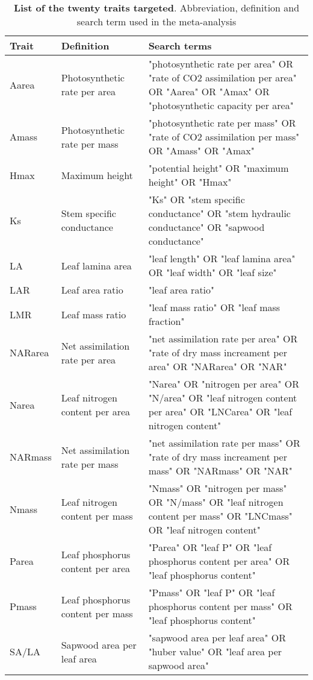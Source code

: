 \documentclass[a4paper]{article}\usepackage[]{graphicx}\usepackage[]{color}
\begin{document}
\begin{appendices}
\begin{table}[ht]
\centering
\caption{\textbf{List of the twenty traits targeted}. Abbreviation,
definition and search term used in the meta-analysis} 
\label{TableA1}
\vspace{0.5cm}
\begin{tabular}{p{3cm}p{3cm}p{8cm}}
  \hline
Trait & Definition & Search terms \\
  \hline
Aarea & Photosynthetic rate per area & "photosynthetic rate per area" OR "rate of CO2 assimilation per area" OR "Aarea" OR "Amax" OR "photosynthetic capacity per area" \\
  Amass & Photosynthetic rate per mass & "photosynthetic rate per mass" OR "rate of CO2 assimilation per mass" OR "Amass" OR "Amax" \\
  Hmax & Maximum height & "potential height" OR "maximum height" OR "Hmax" \\
  Ks & Stem specific conductance & "Ks" OR "stem specific conductance" OR "stem hydraulic conductance" OR "sapwood conductance" \\
  LA & Leaf lamina area & "leaf length" OR "leaf lamina area" OR "leaf width" OR "leaf size" \\
  LAR & Leaf area ratio & "leaf area ratio" \\
  LMR & Leaf mass ratio & "leaf mass ratio" OR "leaf mass fraction" \\
  NARarea & Net assimilation rate per area &  "net assimilation rate per area" OR "rate of dry mass increament per area" OR "NARarea" OR "NAR" \\
  Narea & Leaf nitrogen content per area & "Narea" OR "nitrogen per area" OR "N/area" OR "leaf nitrogen content per area" OR "LNCarea" OR "leaf nitrogen content" \\
  NARmass & Net assimilation rate per mass &  "net assimilation rate per mass" OR "rate of dry mass increament per mass" OR "NARmass" OR "NAR" \\
  Nmass & Leaf nitrogen content per mass & "Nmass" OR "nitrogen per mass" OR "N/mass" OR "leaf nitrogen content per mass" OR "LNCmass" OR "leaf nitrogen content" \\
  Parea & Leaf phosphorus content per area & "Parea" OR "leaf P" OR  "leaf phosphorus content per area"  OR "leaf phosphorus content" \\
  Pmass & Leaf phosphorus content per mass & "Pmass" OR "leaf P" OR  "leaf phosphorus content per mass" OR "leaf phosphorus content" \\
  SA/LA & Sapwood area per leaf area & "sapwood area per leaf area" OR "huber value" OR "leaf area per sapwood area" \\

\end{tabular}
\end{table}
\end{appendices}
\end{document}
